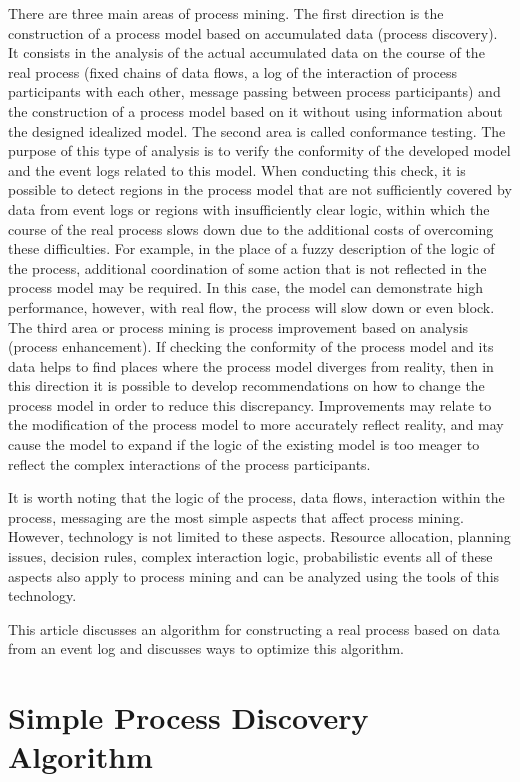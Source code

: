 \documentclass[
11pt,%
tightenlines,%
twoside,%
onecolumn,%
nofloats,%
nobibnotes,%
nofootinbib,%
superscriptaddress,%
noshowpacs,%
centertags]%
{revtex4}
\begin{document}
There are three main areas of process mining.
The first direction is the construction of a process model based on accumulated data (process discovery).
It consists in the analysis of the actual accumulated data on the course of the real process (fixed chains of data flows, a log of the interaction of process participants with each other, message passing between process participants) and the construction of a process model based on it without using information about the designed idealized model.
The second area is called conformance testing.
The purpose of this type of analysis is to verify the conformity of the developed model and the event logs related to this model.
When conducting this check, it is possible to detect regions in the process model that are not sufficiently covered by data from event logs or regions with insufficiently clear logic, within which the course of the real process slows down due to the additional costs of overcoming these difficulties.
For example, in the place of a fuzzy description of the logic of the process, additional coordination of some action that is not reflected in the process model may be required.
In this case, the model can demonstrate high performance, however, with real flow, the process will slow down or even block.
The third area or process mining is process improvement based on analysis (process enhancement).
If checking the conformity of the process model and its data helps to find places where the process model diverges from reality, then in this direction it is possible to develop recommendations on how to change the process model in order to reduce this discrepancy.
Improvements may relate to the modification of the process model to more accurately reflect reality, and may cause the model to expand if the logic of the existing model is too meager to reflect the complex interactions of the process participants.

It is worth noting that the logic of the process, data flows, interaction within the process, messaging are the most simple aspects that affect process mining.
However, technology is not limited to these aspects.
Resource allocation, planning issues, decision rules, complex interaction logic, probabilistic events all of these aspects also apply to process mining and can be analyzed using the tools of this technology.

This article discusses an algorithm for constructing a real process based on data from an event log and discusses ways to optimize this algorithm.

\section{Simple Process Discovery Algorithm}
\end{document}
